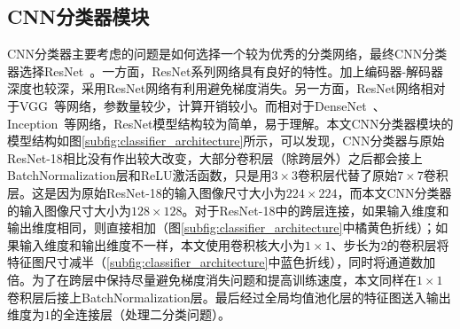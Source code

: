 \subsection{CNN分类器模块}\label{subsec:cnn_classifier_model}
CNN分类器主要考虑的问题是如何选择一个较为优秀的分类网络，最终CNN分类器选择ResNet~\cite{he2016deep}。一方面，ResNet系列网络具有良好的特性。加上编码器-解码器深度也较深，采用ResNet网络有利用避免梯度消失。另一方面，ResNet网络相对于VGG~\cite{simonyan2014very}等网络，参数量较少，计算开销较小。而相对于DenseNet~\cite{huang2017densely}、Inception~\cite{Szegedy2015RethinkingTI}等网络，ResNet模型结构较为简单，易于理解。本文CNN分类器模块的模型结构如图\ref{subfig:classifier_architecture}所示，可以发现，CNN分类器与原始ResNet-18相比没有作出较大改变，大部分卷积层（除跨层外）之后都会接上BatchNormalization层和ReLU激活函数，只是用$3\times 3$卷积层代替了原始$7\times 7$卷积层。这是因为原始ResNet-18的输入图像尺寸大小为$224\times 224$，而本文CNN分类器的输入图像尺寸大小为$128\times 128$。对于ResNet-18中的跨层连接，如果输入维度和输出维度相同，则直接相加（图\ref{subfig:classifier_architecture}中橘黄色折线）；如果输入维度和输出维度不一样，本文使用卷积核大小为$1\times 1$、步长为$2$的卷积层将特征图尺寸减半（\ref{subfig:classifier_architecture}中蓝色折线），同时将通道数加倍。为了在跨层中保持尽量避免梯度消失问题和提高训练速度，本文同样在$1\times 1$卷积层后接上BatchNormalization层。最后经过全局均值池化层的特征图送入输出维度为$1$的全连接层（处理二分类问题）。
